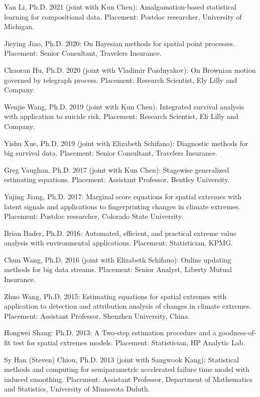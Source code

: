 \documentclass[Statistics]{vita}
\begin{document}
\begin{vita}
\begin{Students}
\begin{Ph.D.}
    \item Yan Li, Ph.D. 2021 (joint with Kun Chen): Amalgamation-based statistical learning for compositional data. Placement: Postdoc researcher, University of Michigan.
    \item Jieying Jiao, Ph.D. 2020: On Bayesian methods for spatial point processes. Placement: Senior Consultant, Travelers Insurance.
    \item Chaoran Hu, Ph.D. 2020 (joint with Vladimir Pozdnyakov): On Brownian motion governed by telegraph process. Placement: Research Scientist, Ely Lilly and Company.
    \item Wenjie Wang, Ph.D. 2019 (joint with Kun Chen): Integrated survival analysis with application to suicide risk. Placement: Research Scientist, Eli Lilly and Company.
    \item Yishu Xue, Ph.D. 2019 (joint with Elizabeth Schifano): Diagnostic methods for big survival data. Placement: Senior Consultant, Travelers Insurance.
    \item Greg Vaughan, Ph.D. 2017 (joint with Kun Chen): Stagewise generalized estimating equations. Placement: Assistant Professor, Bentley University.
    \item Yujing Jiang, Ph.D. 2017: Marginal score equations for spatial extremes with latent signals and applications to fingerprinting changes in climate extremes. Placement: Postdoc researcher, Colorado State University.
    \item Brian Bader, Ph.D. 2016: Automated, efficient, and practical extreme value analysis with environmental applications. Placement: Statistician, KPMG.
    \item Chun Wang, Ph.D. 2016 (joint with Elizabeth Schifano): Online updating methods for big data streams. Placement: Senior Analyst, Liberty Mutual Insurance.
    \item Zhuo Wang, Ph.D. 2015: Estimating equations for spatial extremes with application to detection and attribution analysis of changes in climate extremes. Placement: Assistant Professor, Shenzhen University, China.
    \item Hongwei Shang: Ph.D. 2013: A Two-step estimation procedure and a goodness-of-fit test for spatial extremes models. Placement: Statistician, HP Analytic Lab.
    \item Sy Han (Steven) Chiou, Ph.D. 2013 (joint with Sangwook Kang): Statistical methods and computing for semiparametric accelerated failure time model with induced smoothing. Placement: Assistant Professor, Department of Mathematics and Statistics, University of Minnesota Duluth.

\end{Ph.D.}
\end{Students}
\end{vita}
\end{document}

